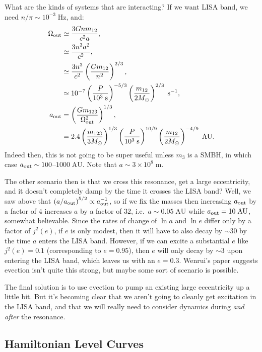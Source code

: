 \documentclass[10pt,
        usenames, %
        dvipsnames %
    ]{article}
\newcommand*{\scinot}[2]{#1\times10^{#2}}
\newcommand*{\p}[1]{\left(#1\right)}
\begin{document}
What are the kinds of systems that are interacting? If we want LISA band, we
need $n / \pi \sim 10^{-3}\;\mathrm{Hz}$, and:
\begin{align}
    \Omega_{\rm out} &\simeq \frac{3Gnm_{12}}{c^2a},\\
        &\simeq \frac{3n^3a^2}{c^2},\\
        &\simeq \frac{3n^3}{c^2}\p{\frac{Gm_{12}}{n^2}}^{2/3},\\
        &\simeq 10^{-7}
            \p{\frac{P}{10^3\;\mathrm{s}}}^{-5/3}
            \p{\frac{m_{12}}{2 M_{\odot}}}^{2/3}\;\mathrm{s^{-1}},\\
    a_{\rm out} &= \p{\frac{Gm_{123}}{\Omega_{\rm out}^2}}^{1/3},\\
        &= 2.4\p{\frac{m_{123}}{3 M_{\odot}}}^{1/3}
            \p{\frac{P}{10^3\;\mathrm{s}}}^{10/9}
            \p{\frac{m_{12}}{2M_{\odot}}}^{-4/9}\;\mathrm{AU}.
\end{align}
Indeed then, this is not going to be super useful unless $m_3$ is a SMBH, in
which case $a_{\rm out} \sim 100$--$1000\;\mathrm{AU}$. Note that $a \sim
\scinot{3}{8}\;\mathrm{m}$.

The other scenario then is that we cross this resonance, get a large
eccentricity, and it doesn't completely damp by the time it crosses the LISA
band? Well, we saw above that $\p{a / a_{\rm out}}^{5/2} \propto a_{\rm
out}^{-1}$, so if we fix the masses then increasing $a_{\rm out}$ by a factor of
$4$ increases $a$ by a factor of $32$, i.e.\ $a \sim 0.05\;\mathrm{AU}$ while
$a_{\rm out} = 10\;\mathrm{AU}$, somewhat believable. Since the rates of change
of $\ln a$ and $\ln e$ differ only by a factor of $j^2(e)$, if $e$ is only
modest, then it will have to also decay by $\sim 30$ by the time $a$ enters the
LISA band. However, if we can excite a substantial $e$ like $j^2(e) = 0.1$
(corresponding to $e = 0.95$), then $e$ will only decay by $\sim 3$ upon
entering the LISA band, which leaves us with an $e = 0.3$. Wenrui's paper
suggests evection isn't quite this strong, but maybe some sort of scenario is
possible.

The final solution is to use evection to pump an existing large eccentricity up
a little bit. But it's becoming clear that we aren't going to cleanly get
excitation in the LISA band, and that we will really need to consider dynamics
during \emph{and after} the resonance.

\subsection{Hamiltonian Level Curves}
\end{document}
